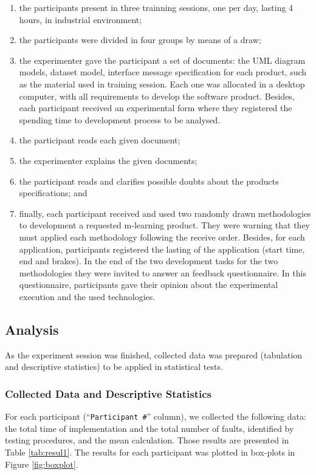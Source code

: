 \begin{enumerate}

\item the participants present in three trainning sessions, one per day, lasting 4 hours, in industrial environment;

\item the participants were divided in four groups by means of a draw;
\item the experimenter gave the participant a set of documents: the UML diagram models, dataset model, interface message specification for each product, such as the material used in training session. Each one was allocated in a desktop computer, with all requirements to develop the software product. Besides, each participant received an experimental form where they registered the spending time to development process to be analysed.
\item the participant reads each given document;
\item the experimenter explains the given documents;
\item the participant reads and clarifies possible doubts about the products specifications; and
\item finally, each participant received and used two randomly drawn methodologies to development a requested m-learning product. They were warning that they must applied each methodology following the receive order. Besides, for each application, participants registered the lasting of the application (start time, end and brakes). In the end of the two development tasks for the two methodologies they were invited to answer an feedback questionnaire. In this questionnaire, participants gave their opinion about the experimental execution and the used technologies.
\end{enumerate}

\subsection{Analysis}\label{sub:analysis}

As the experiment session was finished, collected data was prepared (tabulation and descriptive statistics) to be applied in statistical tests.

\subsubsection{Collected Data and Descriptive Statistics}

For each participant (``\texttt{Participant \#}'' column), we collected the following data: the total time of implementation and the total number of faults, identified by testing procedures, and the mean calculation. Those results are presented in Table \ref{tab:resul1}. The results for each participant was plotted in box-plots in Figure \ref{fig:boxplot}. 

